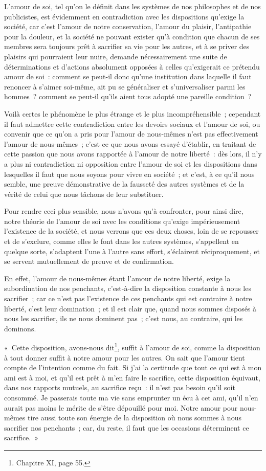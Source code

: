 \documentclass[french,twoside]{book} %
\newcommand\chaptercont{} %
\begin{document}
\chaptercont
\noindent L’amour de soi, tel qu’on le définit dans les systèmes de nos philosophes et de nos publicistes, est évidemment en contradiction avec les dispositions qu’exige la société, car c’est l’amour de notre conservation, l’amour du plaisir, l’antipathie pour la douleur, et la société ne pouvant exister qu’à condition que chacun de ses membres sera toujours prêt à sacrifier sa vie pour les autres, et à se priver des plaisirs qui pourraient leur nuire, demande nécessairement une suite de déterminations et d’actions absolument opposées à celles qu’exigerait ce prétendu amour de soi : comment se peut-il donc qu’une institution dans laquelle il faut renoncer à s’aimer soi-même, ait pu se généraliser et s’universaliser parmi les hommes ? comment se peut-il qu’ils aient tous adopté une pareille condition ?\par
Voilà certes le phénomène le plus étrange et le plus incompréhensible ; cependant il faut admettre cette contradiction entre les devoirs sociaux et l’amour de soi, ou convenir que ce qu’on a pris pour l’amour de nous-mêmes n’est pas effectivement l’amour de nous-mêmes ; c’est ce que nous avons essayé d’établir, en traitant de cette passion que nous avons rapportée à l’amour de notre liberté : dès lors, il n’y a plus ni contradiction ni opposition entre l’amour de soi et les dispositions dans lesquelles il faut que nous soyons pour vivre en société ; et c’est, à ce qu’il nous semble, une preuve démonstrative de la fausseté des autres systèmes et de la vérité de celui que nous tâchons de leur substituer.\par
Pour rendre ceci plus sensible, nous n’avons qu’à confronter, pour ainsi dire, notre théorie de l’amour de soi avec les conditions qu’exige impérieusement l’existence de la société, et nous verrons que ces deux choses, loin de se repousser et de s’exclure, comme elles le font dans les autres systèmes, s’appellent en quelque sorte, s’adaptent l’une à l’autre sans effort, s’éclairent réciproquement, et se servent mutuellement de preuve et de confirmation.\par
En effet, l’amour de nous-mêmes étant l’amour de notre liberté, exige la subordination de nos penchants, c’est-à-dire la disposition constante à nous les sacrifier ; car ce n’est pas l’existence de ces penchants qui est contraire à notre liberté, c’est leur domination ; et il est clair que, quand nous sommes disposés à nous les sacrifier, ils ne nous dominent pas ; c’est nous, au contraire, qui les dominons.\par
« Cette disposition, avons-nous dit\footnote{Chapitre XI, page 55.}, suffit à l’amour de soi, comme la disposition à tout donner suffit à notre amour pour les autres. On sait que l’amour tient compte de l’intention comme du fait. Si j’ai la certitude que tout ce qui est à mon ami est à moi, et qu’il est prêt à m’en faire le sacrifice, cette disposition équivaut, dans nos rapports mutuels, au sacrifice reçu : il n’est pas besoin qu’il soit consommé. Je passerais toute ma vie sans emprunter un écu à cet ami, qu’il n’en aurait pas moins le mérite de s’être dépouillé pour moi. Notre amour pour nous-mêmes tire aussi toute son énergie de la disposition où nous sommes à nous sacrifier nos penchants ; car, du reste, il faut que les occasions déterminent ce sacrifice. »\par
\end{document}
